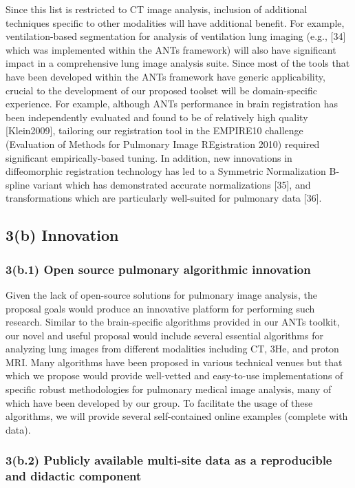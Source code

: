 \documentclass[11pt,]{article}
\begin{document}
Since this list is restricted to CT image analysis, inclusion of
additional techniques specific to other modalities will have additional
benefit. For example, ventilation-based segmentation for analysis of
ventilation lung imaging (e.g., {[}34{]} which was implemented within
the ANTs framework) will also have significant impact in a comprehensive
lung image analysis suite. Since most of the tools that have been
developed within the ANTs framework have generic applicability, crucial
to the development of our proposed toolset will be domain-specific
experience. For example, although ANTs performance in brain registration
has been independently evaluated and found to be of relatively high
quality {[}Klein2009{]}, tailoring our registration tool in the EMPIRE10
challenge (Evaluation of Methods for Pulmonary Image REgistration 2010)
required significant empirically-based tuning. In addition, new
innovations in diffeomorphic registration technology has led to a
Symmetric Normalization B-spline variant which has demonstrated accurate
normalizations {[}35{]}, and transformations which are particularly
well-suited for pulmonary data {[}36{]}.

\subsection{\textbf{3(b) Innovation}}\label{b-innovation}

\subsubsection{3(b.1) Open source pulmonary algorithmic
innovation}\label{b.1-open-source-pulmonary-algorithmic-innovation}

Given the lack of open-source solutions for pulmonary image analysis,
the proposal goals would produce an innovative platform for performing
such research. Similar to the brain-specific algorithms provided in our
ANTs toolkit, our novel and useful proposal would include several
essential algorithms for analyzing lung images from different modalities
including CT, 3He, and proton MRI. Many algorithms have been proposed in
various technical venues but that which we propose would provide
well-vetted and easy-to-use implementations of specific robust
methodologies for pulmonary medical image analysis, many of which have
been developed by our group. To facilitate the usage of these
algorithms, we will provide several self-contained online examples
(complete with data).

\subsubsection{3(b.2) Publicly available multi-site data as a
reproducible and didactic
component}\label{b.2-publicly-available-multi-site-data-as-a-reproducible-and-didactic-component}
\end{document}
